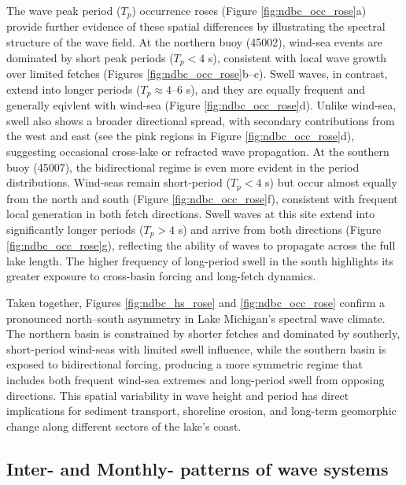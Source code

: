The wave peak period ($T_p$) occurrence roses (Figure \ref{fig:ndbc_occ_rose}a)
provide further evidence of these spatial differences by illustrating the
spectral structure of the wave field. At the northern buoy (45002), wind-sea
events are dominated by short peak periods ($T_p < 4$ s), consistent with local
wave growth over limited fetches (Figures \ref{fig:ndbc_occ_rose}b–c). Swell
waves, in contrast, extend into longer periods ($T_p \approx 4$–6 s), and they
are equally frequent and generally eqivlent with wind-sea (Figure
\ref{fig:ndbc_occ_rose}d). Unlike wind-sea, swell also shows a broader
directional spread, with secondary contributions from the west and east (see the
pink regions in Figure \ref{fig:ndbc_occ_rose}d), suggesting occasional
cross-lake or refracted wave propagation. At the southern buoy (45007), the
bidirectional regime is even more evident in the period distributions. Wind-seas
remain short-period ($T_p < 4$ s) but occur almost equally from the north and
south (Figure \ref{fig:ndbc_occ_rose}f), consistent with frequent local
generation in both fetch directions. Swell waves at this site extend into
significantly longer periods ($T_p > 4$ s) and arrive from both directions
(Figure \ref{fig:ndbc_occ_rose}g), reflecting the ability of waves to propagate
across the full lake length. The higher frequency of long-period swell in the
south highlights its greater exposure to cross-basin forcing and long-fetch
dynamics.

Taken together, Figures \ref{fig:ndbc_hs_rose} and \ref{fig:ndbc_occ_rose}
confirm a pronounced north–south asymmetry in Lake Michigan’s spectral wave
climate. The northern basin is constrained by shorter fetches and dominated by
southerly, short-period wind-seas with limited swell influence, while the
southern basin is exposed to bidirectional forcing, producing a more symmetric
regime that includes both frequent wind-sea extremes and long-period swell from
opposing directions. This spatial variability in wave height and period has
direct implications for sediment transport, shoreline erosion, and long-term
geomorphic change along different sectors of the lake’s coast.

\subsection{Inter- and Monthly- patterns of wave systems}
\label{Inter- and Monthly- patterns of wave systems}

